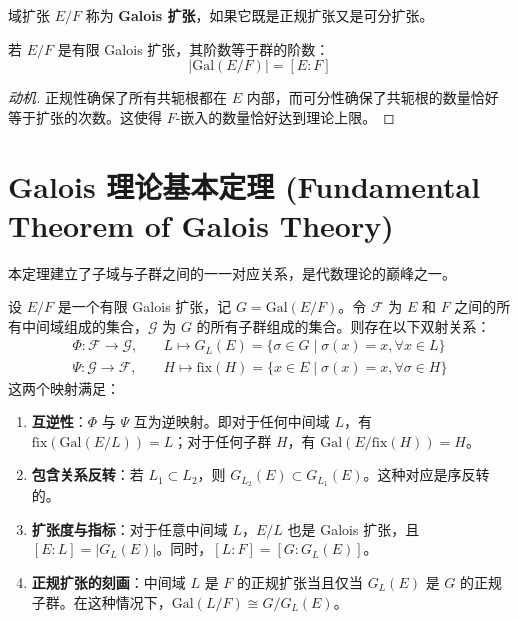 \documentclass[11pt]{article}
\begin{document}
\begin{cndefinition}[Galois 扩张]
    域扩张 $E/F$ 称为 \textbf{Galois 扩张}，如果它既是正规扩张又是可分扩张。
\end{cndefinition}

\begin{cntheorem}
    若 $E/F$ 是有限 Galois 扩张，其阶数等于群的阶数：
    \[ |\text{Gal}(E/F)| = [E:F] \]
\end{cntheorem}

\begin{proof}[动机]
    正规性确保了所有共轭根都在 $E$ 内部，而可分性确保了共轭根的数量恰好等于扩张的次数。这使得 $F$-嵌入的数量恰好达到理论上限。
\end{proof}

\section{Galois 理论基本定理 (Fundamental Theorem of Galois Theory)}

本定理建立了子域与子群之间的一一对应关系，是代数理论的巅峰之一。

\begin{cntheorem}
    设 $E/F$ 是一个有限 Galois 扩张，记 $G = \text{Gal}(E/F)$。令 $\mathcal{F}$ 为 $E$ 和 $F$ 之间的所有中间域组成的集合，$\mathcal{G}$ 为 $G$ 的所有子群组成的集合。则存在以下双射关系：
    \begin{align*}
        \Phi: \mathcal{F} \to \mathcal{G}, & \quad L \mapsto G_L(E) = \{ \sigma \in G \mid \sigma(x) = x, \forall x \in L \} \\
        \Psi: \mathcal{G} \to \mathcal{F}, & \quad H \mapsto \text{fix}(H) = \{ x \in E \mid \sigma(x) = x, \forall \sigma \in H \}
    \end{align*}
    这两个映射满足：
    \begin{enumerate}
        \item \textbf{互逆性}：$\Phi$ 与 $\Psi$ 互为逆映射。即对于任何中间域 $L$，有 $\text{fix}(\text{Gal}(E/L)) = L$；对于任何子群 $H$，有 $\text{Gal}(E/\text{fix}(H)) = H$。
        \item \textbf{包含关系反转}：若 $L_1 \subset L_2$，则 $G_{L_2}(E) \subset G_{L_1}(E)$。这种对应是序反转的。
        \item \textbf{扩张度与指标}：对于任意中间域 $L$，$E/L$ 也是 Galois 扩张，且 $[E:L] = |G_L(E)|$。同时，$[L:F] = [G : G_L(E)]$。
        \item \textbf{正规扩张的刻画}：中间域 $L$ 是 $F$ 的正规扩张当且仅当 $G_L(E)$ 是 $G$ 的正规子群。在这种情况下，$\text{Gal}(L/F) \cong G / G_L(E)$。
    \end{enumerate}
\end{cntheorem}
\end{document}

